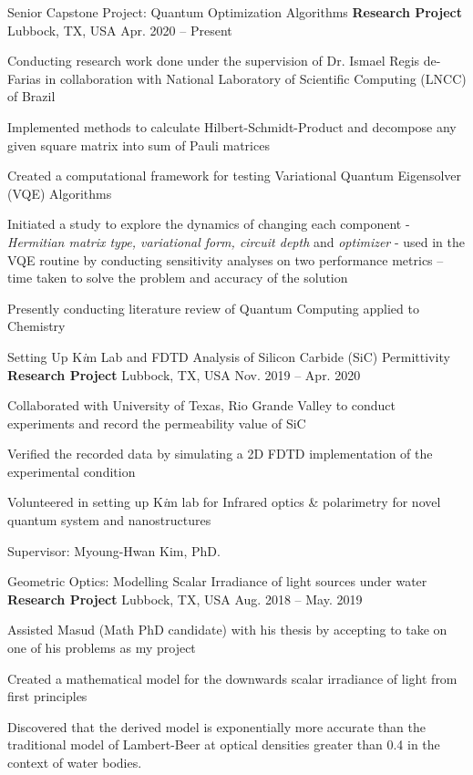 
\begin{cventries}

  \cventry
  {Senior Capstone Project: Quantum Optimization Algorithms}
  {\textbf{Research Project}}
    {Lubbock, TX, USA}
    {Apr. 2020 -- Present}
    {
      \begin{cvitems}
        \item{Conducting research work done under the supervision of Dr. Ismael Regis de-Farias in collaboration with National Laboratory of Scientific Computing (LNCC) of Brazil}
        \item{Implemented methods to calculate Hilbert-Schmidt-Product and decompose any given square matrix into sum of Pauli matrices}
        \item{Created a computational framework for testing Variational Quantum Eigensolver (VQE) Algorithms}
        \item{Initiated a study to explore the dynamics of changing each component - \textit{Hermitian matrix type, variational form, circuit depth} and \textit{optimizer} - used in the VQE routine by conducting sensitivity analyses on two performance metrics – time taken to solve the problem and accuracy of the solution}
        \item{Presently conducting literature review of Quantum Computing applied to Chemistry}
      \end{cvitems}
    }

  \cventry
  {Setting Up K\textit{i}m Lab and FDTD Analysis of Silicon Carbide (SiC) Permittivity}
  {\textbf{Research Project}}
    {Lubbock, TX, USA}
    {Nov. 2019 -- Apr. 2020}
    {
      \begin{cvitems}
      \item{Collaborated with University of Texas, Rio Grande Valley to conduct experiments and record the permeability value of SiC}
      \item{Verified the recorded data by simulating a 2D FDTD implementation of the experimental condition}
      \item{Volunteered in setting up K\textit{i}m lab for Infrared optics \& polarimetry for novel quantum system and nanostructures}
      \item{Supervisor: Myoung-Hwan Kim, PhD.}
      \end{cvitems}
    }

  \cventry
  {Geometric Optics: Modelling Scalar Irradiance of light sources under water}
  {\textbf{Research Project}}
    {Lubbock, TX, USA}
    {Aug. 2018 -- May. 2019}
    {
      \begin{cvitems}
      \item{Assisted Masud (Math PhD candidate) with his thesis by accepting to take on one of his problems as my project}
  \item{Created a mathematical model for the downwards scalar irradiance of light from ﬁrst principles}
  \item{Discovered that the derived model is exponentially more accurate than the traditional model of Lambert-Beer at optical densities greater than 0.4 in the context of water bodies.}
      \end{cvitems}
    }


\end{cventries}
